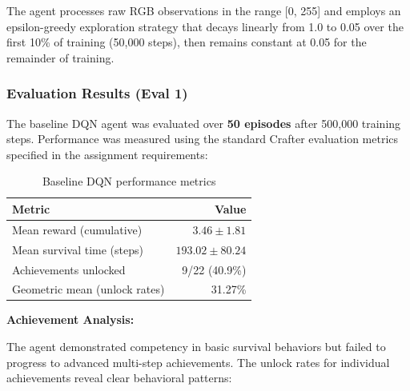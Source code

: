 \documentclass[twocolumn]{article}
\begin{document}
The agent processes raw RGB observations in the range [0, 255] and employs an epsilon-greedy exploration strategy that decays linearly from 1.0 to 0.05 over the first 10\% of training (50,000 steps), then remains constant at 0.05 for the remainder of training.

\subsubsection*{Evaluation Results (Eval 1)}

The baseline DQN agent was evaluated over \textbf{50 episodes} after 500,000 training steps. Performance was measured using the standard Crafter evaluation metrics specified in the assignment requirements:

\begin{table}[H]
\centering
\begin{tabular}{lr}
\toprule
\textbf{Metric} & \textbf{Value} \\
\midrule
Mean reward (cumulative) & $3.46 \pm 1.81$ \\
Mean survival time (steps) & $193.02 \pm 80.24$ \\
Achievements unlocked & 9/22 (40.9\%) \\
Geometric mean (unlock rates) & 31.27\% \\
\bottomrule
\end{tabular}
\caption{Baseline DQN performance metrics}
\end{table}

\textbf{Achievement Analysis:}

The agent demonstrated competency in basic survival behaviors but failed to progress to advanced multi-step achievements. The unlock rates for individual achievements reveal clear behavioral patterns:
\end{document}

